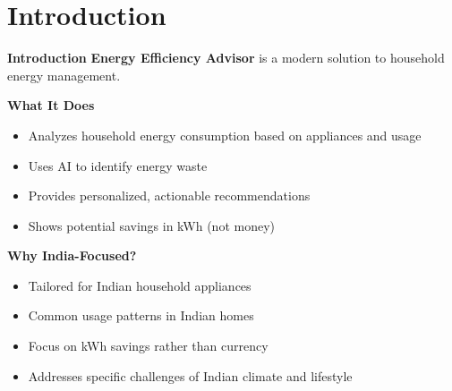 \documentclass[11pt,aspectratio=169,notes,mathserif]{beamer}
\begin{document}
\section{Introduction}
\begin{frame}{\textbf{Introduction}}
    \justifying
    \textbf{Energy Efficiency Advisor} is a modern solution to household energy management.
    
    \begin{block}{\textbf{What It Does}}
        \begin{itemize}
            \item Analyzes household energy consumption based on appliances and usage
            \item Uses AI to identify energy waste
            \item Provides personalized, actionable recommendations
            \item Shows potential savings in kWh (not money)
        \end{itemize}
    \end{block}
    
    \begin{block}{\textbf{Why India-Focused?}}
        \begin{itemize}
            \item Tailored for Indian household appliances
            \item Common usage patterns in Indian homes
            \item Focus on kWh savings rather than currency
            \item Addresses specific challenges of Indian climate and lifestyle
        \end{itemize}
    \end{block}
\end{frame}
\end{document}

